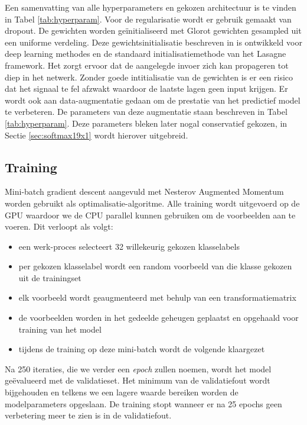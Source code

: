 \npar Een samenvatting van alle hyperparameters en gekozen architectuur is te vinden in Tabel \ref{tab:hyperparam}. Voor de regularisatie wordt er gebruik gemaakt van dropout. De gewichten worden ge\"initialiseerd met Glorot gewichten gesampled uit een uniforme verdeling. Deze gewichtsinitialisatie beschreven in \cite{glorot-1} is ontwikkeld voor deep learning methodes en de standaard initialisatiemethode van het Lasagne framework. Het zorgt ervoor dat de aangelegde invoer zich kan propageren tot diep in het netwerk. Zonder goede intitialisatie van de gewichten is er een risico dat het signaal te fel afzwakt waardoor de laatste lagen geen input krijgen.
\npar Er wordt ook aan data-augmentatie gedaan om de prestatie van het predictief model te verbeteren. De parameters van deze augmentatie staan beschreven in Tabel \ref{tab:hyperparam}. Deze parameters bleken later nogal conservatief gekozen, in Sectie \ref{sec:softmax19x1} wordt hierover uitgebreid.
\subsection{Training}
\npar Mini-batch gradient descent aangevuld met Nesterov Augmented Momentum worden gebruikt als optimalisatie-algoritme. Alle training wordt uitgevoerd op de GPU waardoor we de CPU parallel kunnen gebruiken om de voorbeelden aan te voeren. Dit verloopt als volgt:
\begin{itemize}
	\item een werk-proces selecteert 32 willekeurig gekozen klasselabels
	\item per gekozen klasselabel wordt een random voorbeeld van die klasse gekozen uit de trainingset
	\item elk voorbeeld wordt geaugmenteerd met behulp van een transformatiematrix
	\item de voorbeelden worden in het gedeelde geheugen geplaatst en opgehaald voor training van het model
	\item tijdens de training op deze mini-batch wordt de volgende klaargezet
\end{itemize}
Na 250 iteraties, die we verder een \textit{epoch} zullen noemen, wordt het model ge\"evalueerd met de validatieset. Het minimum van de validatiefout wordt bijgehouden en telkens we een lagere waarde bereiken worden de modelparameters opgeslaan. De training stopt wanneer er na 25 epochs geen verbetering meer te zien is in de validatiefout.

